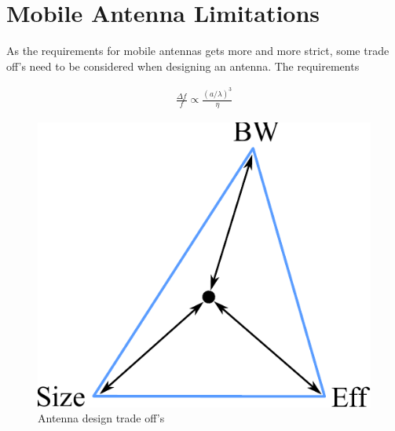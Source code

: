 \section{Mobile Antenna Limitations}
As the requirements for mobile antennas gets more and more strict, some trade off's need to be considered when designing an antenna.
The requirements 

\begin{align*}
  \frac{\Delta f}{f} \propto \frac{(a/ \lambda)^3}{\eta}
\end{align*}


\begin{figure}[htbp]
  \centering
  \includegraphics[scale=1]{img/analysis/antenna_limitations}
  \caption{Antenna design trade off's}
  \label{fig:ant-esa-def}
\end{figure}

\cite{hilbert2015tradeoff}